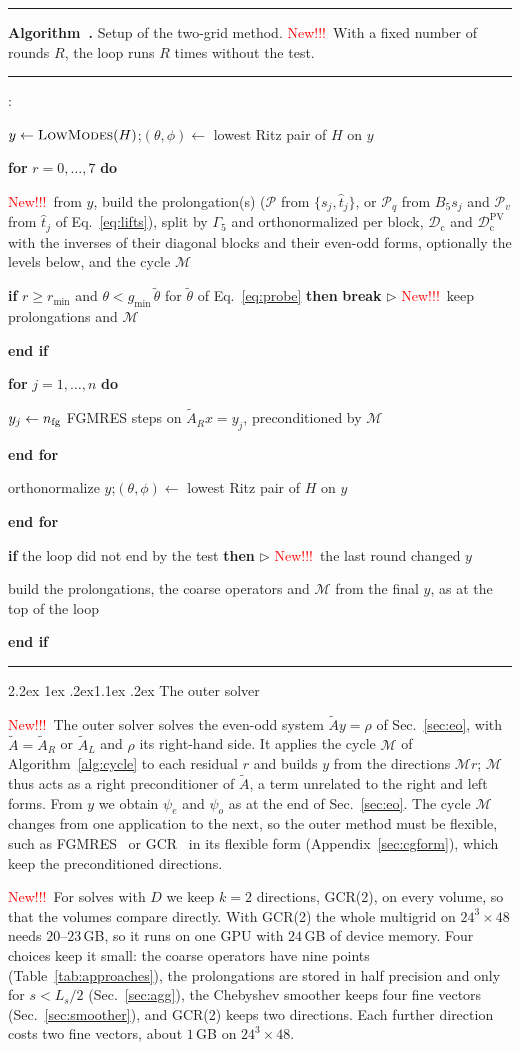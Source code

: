 \documentclass[11pt,a4paper]{article}
\makeatletter
\newcounter{alg}
\newenvironment{algorithm}[1][]{%
  \par\medskip\noindent\begin{minipage}{\linewidth}\hrule\vspace{3pt}%
  \renewcommand{\caption}[1]{\refstepcounter{alg}\textbf{Algorithm~\thealg.} ##1\par\vspace{3pt}\hrule\vspace{2pt}}}%
  {\vspace{2pt}\hrule\end{minipage}\par\medskip}
\newenvironment{algorithmic}{%
  \begin{list}{\small\arabic{enumi}:}{\usecounter{enumi}\setlength{\topsep}{2pt}\setlength{\itemsep}{1pt}%
  \setlength{\leftmargin}{2.2em}\setlength{\labelwidth}{1.6em}}}{\end{list}}
\newcommand{\State}{\item}
\newcommand{\For}[1]{\item \textbf{for} #1 \textbf{do}}
\newcommand{\EndFor}{\item \textbf{end for}}
\newcommand{\If}[1]{\item \textbf{if} #1 \textbf{then}}
\newcommand{\EndIf}{\item \textbf{end if}}
\newcommand{\Comment}[1]{\hfill{\small$\triangleright$ #1}}
\newif\ifshownew \shownewtrue
\DeclareRobustCommand\New{\ifshownew\textcolor{red}{New!!!}\ \else\ignorespaces\fi}
\renewcommand\subsection{\@startsection{subsection}{2}{\z@}%
  {2.2ex \@plus 1ex \@minus .2ex}{1.1ex \@plus .2ex}%
  {\centering\normalfont\small\bfseries}}
\numberwithin{equation}{section}
\newcommand{\Gfive}{\Gamma_5}
\newcommand{\AR}{\tilde A_{R}}
\newcommand{\AL}{\tilde A_{L}}
\newcommand{\Pro}{\mathcal P}
\newcommand{\Pq}{\Pro_q}
\newcommand{\Pv}{\Pro_v}
\newcommand{\Dc}{\mathcal D_{\mathrm c}}
\newcommand{\Dcpv}{\mathcal D_{\mathrm c}^{\mathrm{PV}}}
\newif\ifresults
\makeatother
\begin{document}
\begin{algorithm}
\caption{Setup of the two-grid method. \New With a fixed number of rounds $R$, the loop runs $R$ times without the test.}
\label{alg:setup}
\begin{algorithmic}
\State $y\gets\textsc{LowModes}(H)$;\quad $(\theta,\phi)\gets$ lowest Ritz pair of $H$ on $y$
\For{$r=0,\dots,7$}
  \State \New from $y$, build the prolongation(s) ($\Pro$ from $\{s_j,\hat t_j\}$, or $\Pq$ from $B_5s_j$ and $\Pv$ from $\hat t_j$ of Eq.~\eqref{eq:lifts}), split by $\Gfive$ and orthonormalized per block, $\Dc$ and $\Dcpv$ with the inverses of their diagonal blocks and their even-odd forms, optionally the levels below, and the cycle $\mathcal M$
  \If{$r\ge r_{\min}$ and $\theta<g_{\min}\,\tilde\theta$ for $\tilde\theta$ of Eq.~\eqref{eq:probe}} \textbf{break} \Comment{\New keep prolongations and $\mathcal M$}
  \EndIf
  \For{$j=1,\dots,n$}
    \State $y_j\gets n_{\rm fg}$ FGMRES steps on $\AR x=y_j$, preconditioned by $\mathcal M$
  \EndFor
  \State orthonormalize $y$;\quad $(\theta,\phi)\gets$ lowest Ritz pair of $H$ on $y$
\EndFor
\If{the loop did not end by the test} \Comment{\New the last round changed $y$}
  \State build the prolongations, the coarse operators and $\mathcal M$ from the final $y$, as at the top of the loop
\EndIf
\end{algorithmic}
\end{algorithm}

\subsection{The outer solver}
\label{sec:outer}

\New The outer solver solves the even-odd system $\tilde Ay=\rho$ of Sec.~\ref{sec:eo}, with
$\tilde A=\AR$ or $\AL$ and $\rho$ its right-hand side. It applies the cycle $\mathcal M$ of
Algorithm~\ref{alg:cycle} to each residual $r$ and builds $y$ from the directions $\mathcal Mr$;
$\mathcal M$ thus acts as a right preconditioner of $\tilde A$, a term unrelated to the right and
left forms. From $y$ we obtain $\psi_e$ and $\psi_o$ as at the end of Sec.~\ref{sec:eo}. The cycle $\mathcal M$ changes from one application to the
next, so the outer method must be flexible, such as FGMRES~\cite{SaadFGMRES} or GCR~\cite{ESS} in its
flexible form (Appendix~\ref{sec:cgform}), which keep the preconditioned directions.

\New For solves with $D$ we keep $k=2$ directions, GCR(2), on every volume, so that the volumes
compare directly. With GCR(2) the whole multigrid on $24^3\times48$ needs $20$--$23$\,GB, so it runs
on one GPU with $24$\,GB of device memory. Four choices keep it small: the coarse operators have
nine points (Table~\ref{tab:approaches}), the prolongations are stored in half precision and only for
$s<L_s/2$ (Sec.~\ref{sec:agg}), the Chebyshev smoother keeps four fine vectors
(Sec.~\ref{sec:smoother}), and GCR(2) keeps two directions. Each further direction costs two fine
vectors, about $1$\,GB on $24^3\times48$.\ifresults{} A larger $k$ changes only the outer solver and
leaves the cycle as it is; on $12^4$ it changes the median iterations by at most one
(Sec.~\ref{sec:gcrk}).\fi
\end{document}
